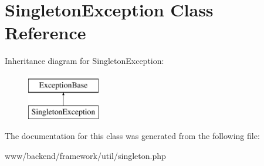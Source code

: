 \hypertarget{classSingletonException}{
\section{SingletonException Class Reference}
\label{classSingletonException}
}
Inheritance diagram for SingletonException:\begin{figure}[H]
\begin{center}
\leavevmode
\includegraphics[height=2.000000cm]{classSingletonException}
\end{center}
\end{figure}


The documentation for this class was generated from the following file:\begin{DoxyCompactItemize}
\item 
www/backend/framework/util/singleton.php\end{DoxyCompactItemize}
